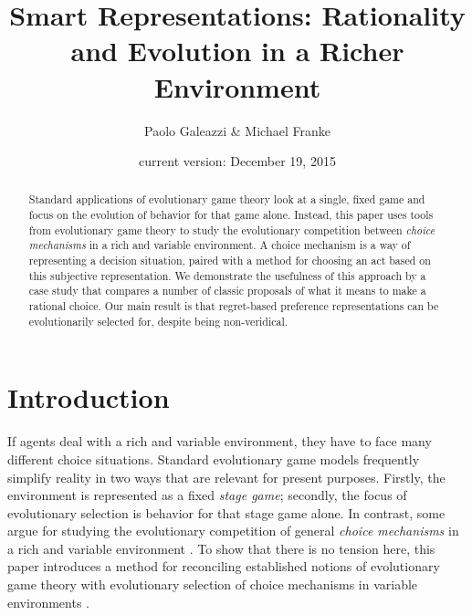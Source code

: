 \documentclass[fleqn,reqno,11pt]{article}
\title{Smart Representations: {R}ationality and Evolution in a Richer  Environment}
\author{Paolo Galeazzi \& Michael Franke} \date{current version: December 19, 2015}
\begin{document}
\maketitle

\begin{abstract}
  Standard applications of evolutionary game theory look at a single, fixed game and focus on
  the evolution of behavior for that game alone. Instead, this paper uses tools from
  evolutionary game theory to study the evolutionary competition between \emph{choice
    mechanisms} in a rich and variable environment. A choice mechanism is a way of representing
  a decision situation, paired with a method for choosing an act based on this 
  subjective representation. We demonstrate the usefulness of this approach by a case study
  that compares a number of classic proposals of what it means to make a rational choice. Our
  main result is that regret-based preference representations can be evolutionarily selected
  for, despite being non-veridical.
\end{abstract}

\section{Introduction}
\label{sec:intr--motiv}



If agents deal with a rich and variable environment, they have to face many different choice
situations.
Standard evolutionary game models frequently
simplify reality in two ways that are relevant for present purposes. Firstly, the environment
is represented as a fixed \emph{stage game}; secondly, the focus of
evolutionary selection is behavior for that stage game alone. In contrast, some argue for
studying the evolutionary competition of general \emph{choice mechanisms} in a rich and
variable environment
\citep[e.g.,][]{FawcettHamblin2013:Exposing-the-be,McNamara2013:Towards-a-Riche}. To show that
there is no tension here, this paper introduces a method for reconciling established notions of
evolutionary game theory with evolutionary selection of choice mechanisms in variable
environments \citep[see related work
by][]{ZollmanSmead2010:Plasticity-and-,SmeadZollman2013:The-Stability-o}.
\end{document}
